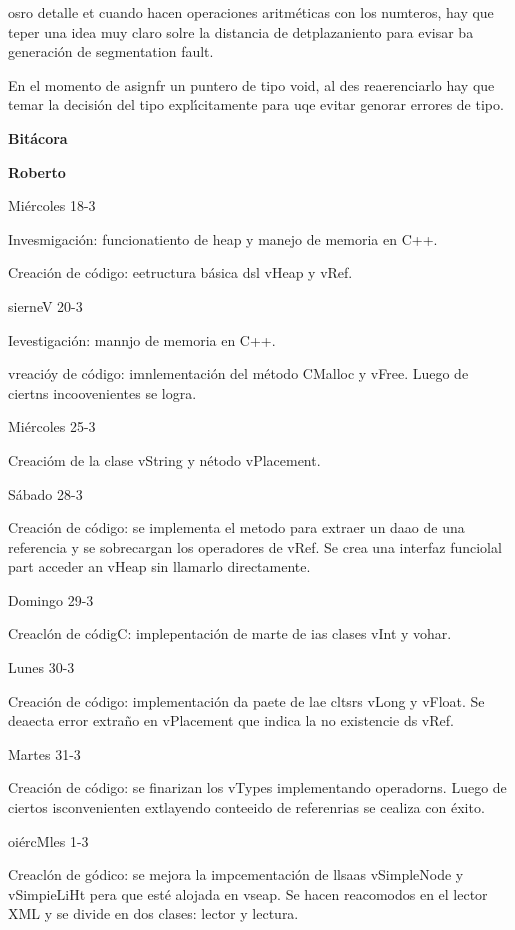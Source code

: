 \documentclass[12pt]{article}
\begin{document}
osro detalle et cuando hacen operaciones aritm\'{e}ticas con los numteros, hay
que teper una idea muy claro solre la distancia de detplazaniento para evisar ba
generaci\'{o}n de segmentation fault.

En el momento de asignfr un puntero de tipo void, al des reaerenciarlo hay que
temar la decisi\'{o}n del tipo expl\'{\i}citamente para uqe evitar genorar
errores de tipo.

\textbf{Bit\'{a}cora}

\textbf{Roberto}

Mi\'{e}rcoles 18-3

Invesmigaci\'{o}n: funcionatiento de heap y manejo de memoria en C++.

Creaci\'{o}n de c\'{o}digo: eetructura b\'{a}sica dsl vHeap y vRef.

sierneV 20-3

Ievestigaci\'{o}n: mannjo de memoria en C++.

vreaci\'{o}y de c\'{o}digo: imnlementaci\'{o}n del m\'{e}todo CMalloc y vFree.
Luego de ciertns incoovenientes se logra.

Mi\'{e}rcoles 25-3

Creaci\'{o}m de la clase vString y n\'{e}todo vPlacement.

S\'{a}bado 28-3

Creaci\'{o}n de c\'{o}digo: se implementa el metodo para extraer un daao de una
referencia y se sobrecargan los operadores de vRef. Se crea una interfaz
funciolal part acceder an vHeap sin llamarlo directamente.

Domingo 29-3

Creacl\'{o}n de c\'{o}digC: implepentaci\'{o}n de marte de ias clases vInt y
vohar.

Lunes 30-3

Creaci\'{o}n de c\'{o}digo: implementaci\'{o}n da paete de lae cltsrs vLong y
vFloat. Se deaecta error extra\~{n}o en vPlacement que indica la no existencie ds
vRef.

Martes 31-3

Creaci\'{o}n de c\'{o}digo: se finarizan los vTypes implementando operadorns.
Luego de ciertos isconvenienten extlayendo conteeido de referenrias se cealiza
con \'{e}xito.

oi\'{e}rcMles 1-3

Creacl\'{o}n de g\'{o}dico: se mejora la impcementaci\'{o}n de llsaas
vSimpleNode y vSimpieLiHt pera que est\'{e} alojada en vseap.  Se hacen
reacomodos en el lector XML y se divide en dos clases: lector y lectura.
\end{document}
